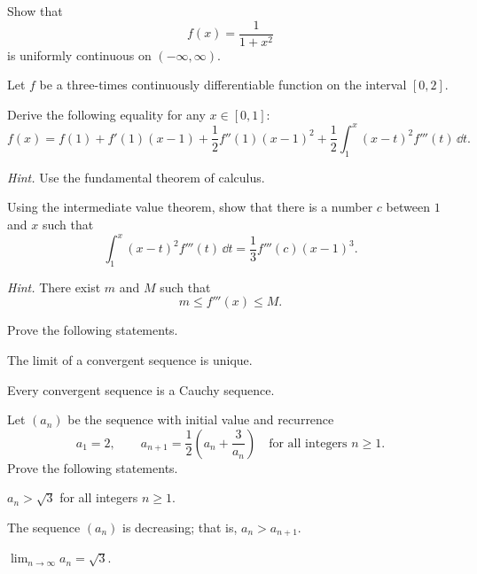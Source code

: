 \begin{problem}
Show that
\[
f(x)=\frac{1}{1+x^2}
\]
is uniformly continuous on $(-\infty, \infty)$.
\end{problem}

\begin{problem}
Let $f$ be a three-times continuously differentiable function on the interval $[0, 2]$.
\begin{problemsubparts}
\item Derive the following equality for any $x\in[0, 1]$:
\[
f(x)
=
f(1)+f'(1)(x-1)
+\frac12 f''(1)(x-1)^2
+\frac12\int_1^x (x-t)^2f'''(t)\,\dd t.
\]

\textit{Hint.} Use the fundamental theorem of calculus.
\item Using the intermediate value theorem, show that there is a number $c$ between $1$ and $x$ such that
\[
\int_1^x (x-t)^2f'''(t)\,\dd t
=
\frac13 f'''(c)(x-1)^3.
\]

\textit{Hint.} There exist $m$ and $M$ such that
\[
m\le f'''(x)\le M.
\]
\end{problemsubparts}
\end{problem}

\begin{problem}
Prove the following statements.
\begin{problemsubparts}
\item The limit of a convergent sequence is unique.
\item Every convergent sequence is a Cauchy sequence.
\end{problemsubparts}
\end{problem}

\begin{problem}
Let $(a_n)$ be the sequence with initial value and recurrence
\[
a_1=2,
\qquad
a_{n+1}=\frac12\left(a_n+\frac{3}{a_n}\right)
\quad\text{for all integers }n\ge1.
\]
Prove the following statements.
\begin{problemsubparts}
\item $a_n>\sqrt3$ for all integers $n\ge1$.
\item The sequence $(a_n)$ is decreasing; that is, $a_n>a_{n+1}$.
\item $\displaystyle\lim_{n\to\infty}a_n=\sqrt3$.
\end{problemsubparts}
\end{problem}

